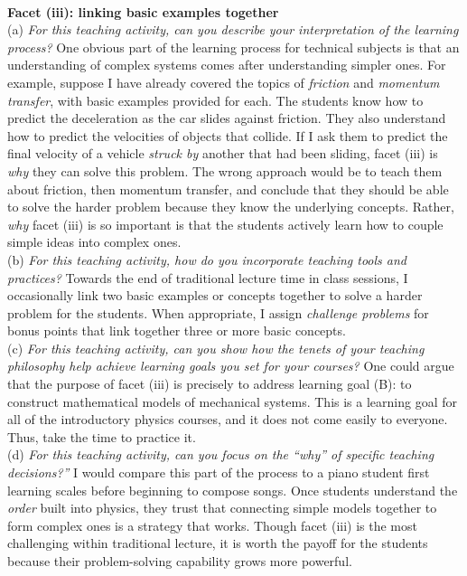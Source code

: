 \documentclass[../../../main.tex]{subfiles}
\begin{document}
\\
\vspace{0.25cm}
\textbf{Facet (iii): linking basic examples together}
\\
\vspace{0.25cm}
(a) \textit{For this teaching activity, can you describe your interpretation of the learning process?} One obvious part of the learning process for technical subjects is that an understanding of complex systems comes after understanding simpler ones.  For example, suppose I have already covered the topics of \textit{friction} and \textit{momentum transfer}, with basic examples provided for each.  The students know how to predict the deceleration as the car slides against friction.  They also understand how to predict the velocities of objects that collide.  If I ask them to predict the final velocity of a vehicle \textit{struck by} another that had been sliding, facet (iii) is \textit{why} they can solve this problem.  The wrong approach would be to teach them about friction, then momentum transfer, and conclude that they should be able to solve the harder problem because they know the underlying concepts.  Rather, \textit{why} facet (iii) is so important is that the students actively learn how to couple simple ideas into complex ones.
\\
\vspace{0.25cm}
(b) \textit{For this teaching activity, how do you incorporate teaching tools and practices?} Towards the end of traditional lecture time in class sessions, I occasionally link two basic examples or concepts together to solve a harder problem for the students.  When appropriate, I assign \textit{challenge problems} for bonus points that link together three or more basic concepts.
\\
\vspace{0.25cm}
(c) \textit{For this teaching activity, can you show how the tenets of your teaching philosophy help achieve learning goals you set for your courses?}  One could argue that the purpose of facet (iii) is precisely to address learning goal (B): to construct mathematical models of mechanical systems.  This is a learning goal for all of the introductory physics courses, and it does not come easily to everyone.  Thus, take the time to practice it.
\\
\vspace{0.25cm}
(d) \textit{For this teaching activity, can you focus on the ``why'' of specific teaching decisions?''}  I would compare this part of the process to a piano student first learning scales before beginning to compose songs.  Once students understand the \textit{order} built into physics, they trust that connecting simple models together to form complex ones is a strategy that works.  Though facet (iii) is the most challenging within traditional lecture, it is worth the payoff for the students because their problem-solving capability grows more powerful.
\end{document}

